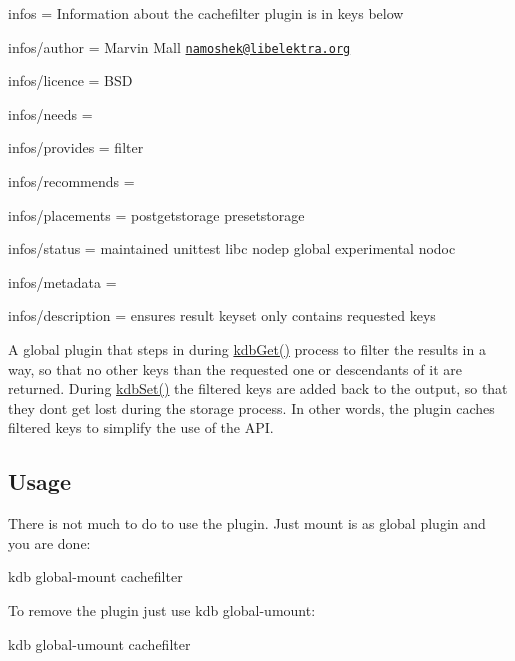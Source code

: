 
\begin{DoxyItemize}
\item infos = Information about the cachefilter plugin is in keys below
\item infos/author = Marvin Mall \href{mailto:namoshek@libelektra.org}{\tt namoshek@libelektra.\+org}
\item infos/licence = B\+SD
\item infos/needs =
\item infos/provides = filter
\item infos/recommends =
\item infos/placements = postgetstorage presetstorage
\item infos/status = maintained unittest libc nodep global experimental nodoc
\item infos/metadata =
\item infos/description = ensures result keyset only contains requested keys
\end{DoxyItemize}

A global plugin that steps in during {\ttfamily \hyperlink{group__kdb_ga28e385fd9cb7ccfe0b2f1ed2f62453a1}{kdb\+Get()}} process to filter the results in a way, so that no other keys than the requested one or descendants of it are returned. During {\ttfamily \hyperlink{group__kdb_ga11436b058408f83d303ca5e996832bcf}{kdb\+Set()}} the filtered keys are added back to the output, so that they don\textquotesingle{}t get lost during the storage process. In other words, the plugin caches filtered keys to simplify the use of the A\+PI.

\subsection*{Usage}

There is not much to do to use the plugin. Just mount is as global plugin and you are done\+:


\begin{DoxyCode}
kdb global-mount cachefilter
\end{DoxyCode}


To remove the plugin just use {\ttfamily kdb global-\/umount}\+:


\begin{DoxyCode}
kdb global-umount cachefilter
\end{DoxyCode}
 